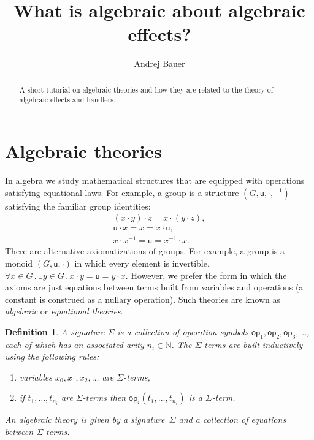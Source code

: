 \documentclass{amsart}
\newcommand{\NN}{\mathbb{N}}
\newcommand{\all}[1]{\forall #1 \,.\,}
\newcommand{\some}[1]{\exists #1 \,.\,}
\newcommand{\op}{\mathsf{op}}
\newtheorem{definition}{Definition}[section]
\begin{document}
\title{What is algebraic about algebraic effects?}

\author{Andrej Bauer}

\begin{abstract}
  A short tutorial on algebraic theories and how they are related to the theory of
  algebraic effects and handlers.
\end{abstract}

\maketitle

\section{Algebraic theories}
\label{sec:algebraic-theories}


In algebra we study mathematical structures that are equipped with operations satisfying
equational laws. For example, a group is a structure $(G, \mathsf{u}, {\cdot}, {}^{-1})$ satisfying
the familiar group identities:
%
\begin{gather*}
  (x \cdot y) \cdot z = x \cdot (y \cdot z),\\
  \mathsf{u} \cdot x = x = x \cdot \mathsf{u},\\
  x \cdot x^{-1} = \mathsf{u} = x^{-1} \cdot x.
\end{gather*}
%
There are alternative axiomatizations of groups. For example, a group is a monoid
$(G, \mathsf{u}, {\cdot})$ in which every element is invertible,
$\all{x \in G} \some{y \in G} x \cdot y = \mathsf{u} = y \cdot x$. However, we prefer the
form in which the axioms are just equations between terms built from variables and
operations (a constant is construed as a nullary operation). Such theories are known as
\emph{algebraic} or \emph{equational theories}.


\begin{definition}
  \label{def:algebraic-theory}
  A \emph{signature $\Sigma$} is a collection of \emph{operation symbols}
  $\op_1, \op_2, \op_3, \ldots$, each of which has an associated \emph{arity}
  $n_i \in \NN$. The \emph{$\Sigma$-terms} are built inductively using the following
  rules:
  \begin{enumerate}
  \item \emph{variables} $x_0, x_1, x_2, \ldots$ are $\Sigma$-terms,
  \item if $t_1, \ldots, t_{n_i}$ are $\Sigma$-terms then $\op_i(t_1, \ldots, t_{n_i})$ is
    a $\Sigma$-term.
  \end{enumerate}
  An \emph{algebraic theory} is given by a signature~$\Sigma$ and a collection of equations
  between $\Sigma$-terms.
\end{definition}
\end{document}
